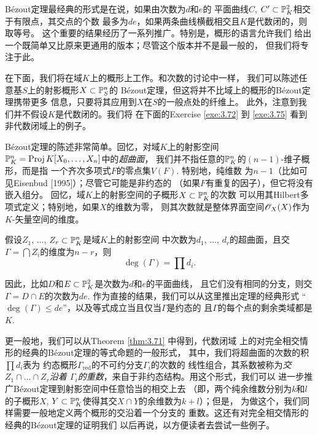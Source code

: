 B\'ezout定理最经典的形式是在说，如果由次数为$d$和$e$的
平面曲线$C$, $C'\subset \P_K^2$相交于有限点，其交点的个数
最多为$de$，如果两条曲线横截相交且$K$是代数闭的，则取等号。
这个重要的结果经历了一系列推广。特别是，概形的语言允许我们
给出一个既简单又比原来更通用的版本；尽管这个版本并不是最一般的，
但我们将专注于此。

在下面，我们将在域$K$上的概形上工作。和次数的讨论中一样，
我们可以陈述任意基$S$上的射影概形$X\subset \P_S^n$的
B\'ezout定理，但这将并不比域上的概形的B\'ezout定理携带更多
信息，只要将其应用到$X$在$S$的一般点处的纤维上。
此外，注意到我们并不假设$K$是代数闭的。我们将
在下面的Exercise \ref{exe:3.72} 到 \ref{exe:3.75} 
看到非代数闭域上的例子。


B\'ezout定理的陈述非常简单。回忆，对域$K$上的射影空间
$\P_K^n=\proj K[X_0,\dots,X_n]$中的\textit{超曲面}，
我们并不指任意的$\P_K^n$的$(n-1)$-维子概形，而是指
一个齐次多项式$F$的零点集$V(F)$. 特别地，纯维数
为$n-1$（比如可见Eisenbud [1995]）；尽管它可能是非约态的
（如果$F$有重复的因子），但它将没有嵌入组分。
回忆，域$K$上的射影空间的子概形$X\subset \P_K^n$的次数
可以用其Hilbert多项式定义；特别地，如果$X$的维数为零，
则其次数就是整体界面空间$\oo_X(X)$作为$K$-矢量空间的维度。

\begin{thm}
\label{thm:3.71}
假设$Z_1$, $\dots$, $Z_r\subset \P_K^n$是域$K$上的射影空间
中次数为$d_1$, $\dots$, $d_r$的超曲面，且交
$\Gamma=\bigcap Z_i$的维度为$n-r$，则
\[
	\deg(\Gamma)=\prod d_i.
\]
\end{thm}

因此，比如$D$和$E\subset \P_K^2$是次数为$d$和$e$的平面曲线，
且它们没有相同的分支，则交$\Gamma=D\cap E$的次数为$de$. 
作为直接的结果，我们可以从这里推出定理的经典形式
“$\deg(\Gamma)\leq de$”，以及等式成立当且仅当$\Gamma$是约态的
且$\Gamma$的每个点的剩余类域都是$K$.

更一般地，我们可以从Theorem \ref{thm:3.71} 中得到，代数闭域
上的对完全相交情形的经典的B\'ezout定理的等式命题的一般形式，
其中，我们将超曲面的次数的积$\prod d_i$表为
约态概形$\Gamma_{\text{red}}$的不可约分支$\Gamma_i$的次数的
线性组合，其系数被称为\textit{交$Z_1\cap \dots\cap Z_r$沿着
$\Gamma_i$的重数}，来自于非约态结构。用这个形式，我们可以
进一步推广B\'ezout定理到射影空间中任意恰当的相交上去
（即，两个纯余维数分别为$k$和$l$的子概形$X$, 
$Y\subset \P_K^n$使得其交$X\cap Y$的余维数为$k+l$）；但是，
为做这个，我们同样需要一般地定义两个概形的交沿着一个分支的
重数。这还有对完全相交情形的经典的B\'ezout定理的证明我们
以后再说，以方便读者去尝试一些例子。

